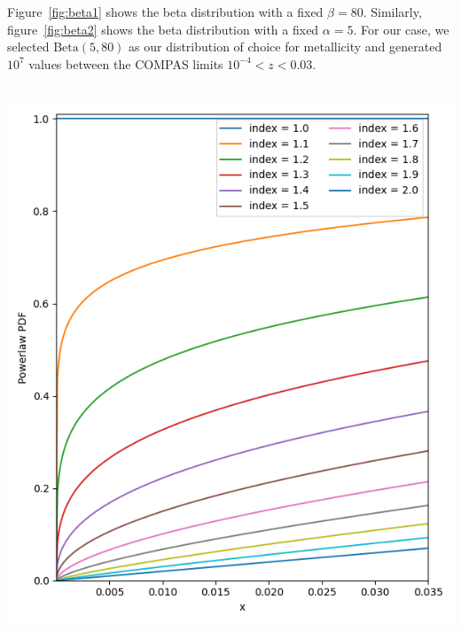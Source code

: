 Figure~\ref{fig:beta1} shows the beta distribution with a fixed $\beta=80$.
Similarly, figure~\ref{fig:beta2} shows the beta distribution with a fixed $\alpha=5$.
For our case, we selected $\text{Beta}(5, 80)$ as our distribution of choice for metallicity and generated $10^7$ values between the COMPAS limits $10^{-4} < z < 0.03$.
\,\\\,\\
\begin{minipage}[l]{0.45\columnwidth}%
    \centering
    \includegraphics[width=\linewidth]{images/powerlaw}
    \label{fig:pl_distribution}
\end{minipage}
\hfill
